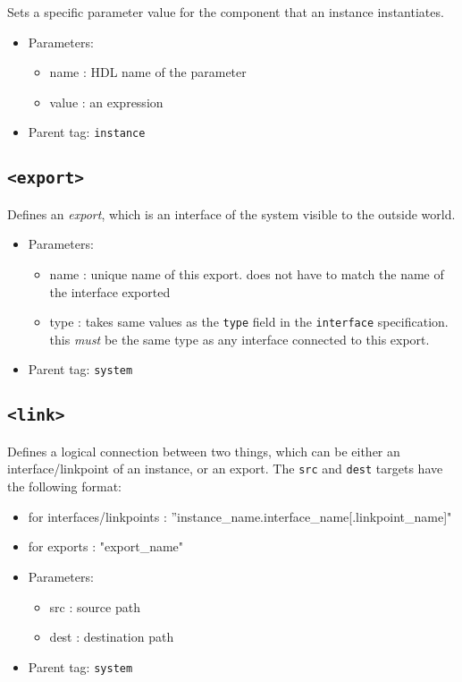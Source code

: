 \documentclass{article}
\begin{document}
Sets a specific parameter value for the component that an instance instantiates.

\begin{itemize}
\item{Parameters:}
\begin{itemize}
\item{name : HDL name of the parameter}
\item{value : an expression}
\end{itemize}
\item{Parent tag: \texttt{instance}}
\end{itemize}

\subsection{\texttt{<export>}}

Defines an \textit{export}, which is an interface of the system visible to the outside world. 

\begin{itemize}
\item{Parameters:}
\begin{itemize}
\item{name : unique name of this export. does not have to match the name of the interface exported}
\item{type : takes same values as the \texttt{type} field in the \texttt{interface} specification. this \textit{must} be the same type as any interface connected to this export.}
\end{itemize}
\item{Parent tag: \texttt{system}}
\end{itemize}

\subsection{\texttt{<link>}}

Defines a logical connection between two things, which can be either an interface/linkpoint of an instance, or an export. The \texttt{src} and \texttt{dest} targets have the following format:
\begin{itemize}
\item{for interfaces/linkpoints : ''instance\_name.interface\_name[.linkpoint\_name]"}
\item{for exports : "export\_name"}
\end{itemize}

\begin{itemize}
\item{Parameters:}
\begin{itemize}
\item{src : source path}
\item{dest : destination path}
\end{itemize}
\item{Parent tag: \texttt{system}}
\end{itemize}
\end{document}
